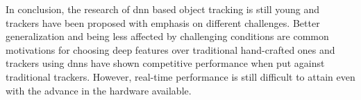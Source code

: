 In conclusion, the research of \ac{dnn} based object tracking is still young and
trackers have been proposed with emphasis on different challenges. Better generalization
and being less affected by challenging conditions are common motivations for choosing
deep features over traditional hand-crafted ones and trackers using \ac{dnn}s have
shown competitive performance when put against traditional trackers. However, real-time
performance is still difficult to attain even with the advance in the hardware available.
